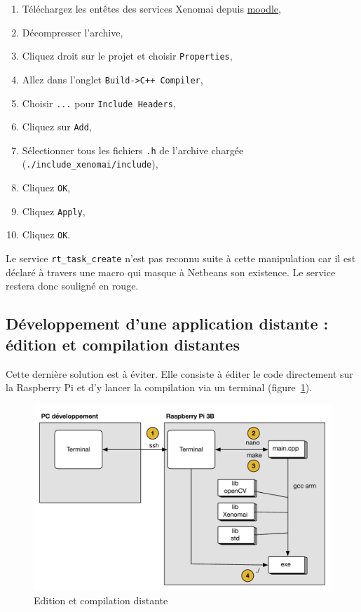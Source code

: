 \documentclass[11pt]{paper}
\newcommand{\raspi}{Raspberry Pi\xspace}
\begin{document}
\begin{enumerate}
\item Téléchargez les entêtes des services Xenomai depuis \href{https://moodle.insa-toulouse.fr/mod/resource/view.php?id=37439}{moodle},
\item Décompresser l'archive,
\item Cliquez droit sur le projet et choisir {\tt Properties},
\item Allez dans l'onglet {\tt Build->C++ Compiler},
\item Choisir {\tt ...} pour {\tt Include Headers},
\item Cliquez sur {\tt Add},
\item Sélectionner tous les fichiers {\tt .h} de l'archive chargée ({\tt ./include\_xenomai/include}),
\item Cliquez {\tt OK},
\item Cliquez {\tt Apply},
\item Cliquez {\tt OK}.
\end{enumerate}

Le service {\tt rt\_task\_create} n'est pas reconnu suite à cette manipulation car il est déclaré à travers une macro qui masque à Netbeans son existence. Le service restera donc souligné en rouge.

\subsection{Développement d'une application distante : édition et compilation distantes}

Cette dernière solution est à éviter. Elle consiste à éditer le code directement sur la \raspi et d'y lancer la compilation via un terminal (figure~\ref{fig:edition1}).

\begin{figure}[htbp]
\begin{center}
\includegraphics[scale=0.45]{./figures-pdf/edition1}
\caption{Edition et compilation distante}
\label{fig:edition1}
\end{center}
\end{figure}
\end{document}
